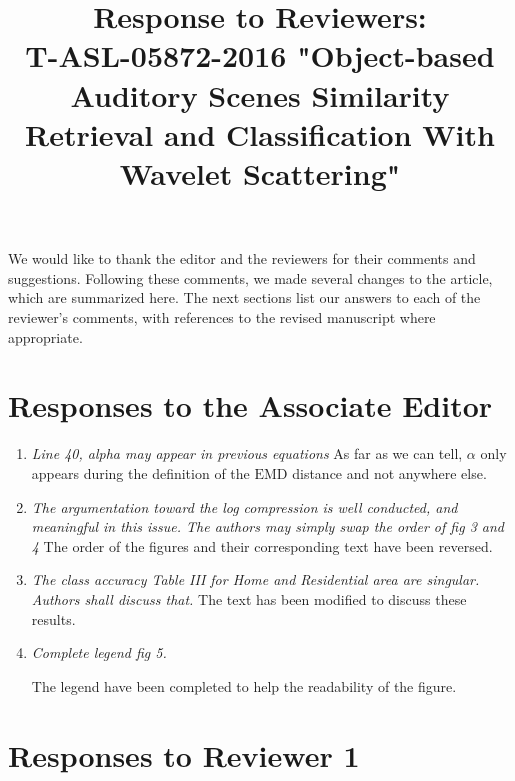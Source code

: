 \documentclass[10pt]{article}
\title{Response to Reviewers: \\ T-ASL-05872-2016 "Object-based Auditory Scenes Similarity Retrieval and Classification With Wavelet Scattering"}
\begin{document}
\maketitle

We would like to thank the editor and the reviewers for their comments and suggestions. Following these comments, we made several changes to the article, which are summarized here. The next sections list our answers to each of the reviewer's comments, with references to the revised manuscript where appropriate.

\section{Responses to the Associate Editor}

\begin{enumerate}

\item \emph{Line 40, alpha may appear in previous equations}
As far as we can tell, $\alpha$ only appears during the definition of the $\widehat{\mathrm{EMD}}$ distance and not anywhere else.

\item \emph{The argumentation toward the log compression is well conducted, and meaningful in this issue. The authors may simply swap the order of fig 3 and 4}
The order of the figures and their corresponding text have been reversed.

\item \emph{The class accuracy Table III for Home and Residential area are singular. Authors shall discuss that.}
The text has been modified to discuss these results.

\item \emph{Complete legend fig 5.}

The legend have been completed to help the readability of the figure.

\end{enumerate}

\section{Responses to Reviewer 1}
\end{document}
